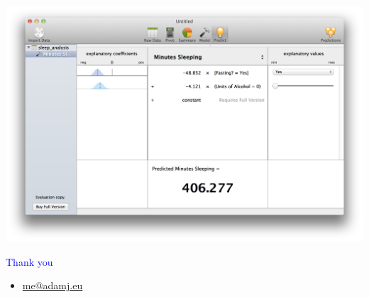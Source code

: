 \documentclass[landscape]{slides}
\begin{document}
\begin{slide}
    \includegraphics[width=\textwidth]{sleep-analysis-model}
\end{slide}

\begin{slide}
    \textcolor{blue}{\Large{Thank you}}

    \begin{itemize}
        \item \url{me@adamj.eu}
    \end{itemize}

\end{slide}
\end{document}
